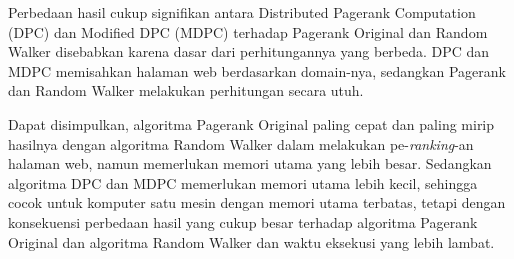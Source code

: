 Perbedaan hasil cukup signifikan antara Distributed Pagerank Computation (DPC) dan Modified DPC (MDPC) terhadap Pagerank Original dan Random Walker disebabkan karena dasar dari perhitungannya yang berbeda. DPC dan MDPC memisahkan halaman web berdasarkan domain-nya, sedangkan Pagerank dan Random Walker melakukan perhitungan secara utuh.

Dapat disimpulkan, algoritma Pagerank Original paling cepat dan paling mirip hasilnya dengan algoritma Random Walker dalam melakukan pe-\textit{ranking}-an halaman web, namun memerlukan memori utama yang lebih besar. Sedangkan algoritma DPC dan MDPC memerlukan memori utama lebih kecil, sehingga cocok untuk komputer satu mesin dengan memori utama terbatas, tetapi dengan konsekuensi perbedaan hasil yang cukup besar terhadap algoritma Pagerank Original dan algoritma Random Walker dan waktu eksekusi yang lebih lambat.